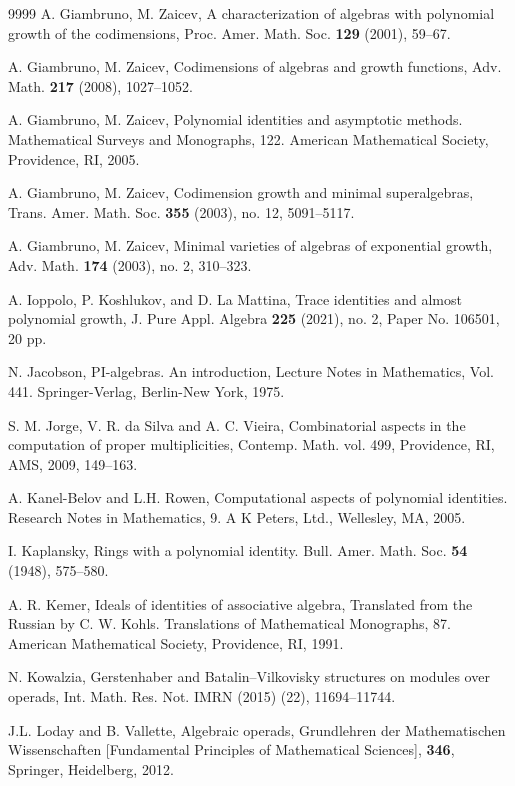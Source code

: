 \documentclass{amsart}
\theoremstyle{definition}
\theoremstyle{remark}
\numberwithin{equation}{section}
\begin{document}
\begin{thebibliography}{9999}
A. Giambruno, M. Zaicev, 
A characterization of algebras with polynomial growth of the codimensions,
Proc. Amer. Math. Soc. \textbf{129} (2001), 59–67.
	
A. Giambruno, M. Zaicev,
Codimensions of algebras and growth functions,
Adv. Math. \textbf{217} (2008), 1027--1052.
	
A. Giambruno, M. Zaicev,
Polynomial identities and asymptotic methods.
Mathematical Surveys and Monographs, 122. American Mathematical Society, Providence, RI, 2005.


A. Giambruno, M. Zaicev,
Codimension growth and minimal superalgebras, 
Trans. Amer. Math. Soc. {\bf 355} (2003), no. 12, 5091--5117. 

A. Giambruno, M. Zaicev,
Minimal varieties of algebras of exponential growth, 
Adv. Math. {\bf 174} (2003), no. 2, 310--323. 

A. Ioppolo, P. Koshlukov, and D. La Mattina, 
Trace identities and almost polynomial growth, 
J. Pure Appl. Algebra {\bf 225} (2021), no. 2, 
Paper No. 106501, 20 pp.



N. Jacobson, PI-algebras. An introduction, Lecture Notes in Mathematics, Vol. 441.
Springer-Verlag, Berlin-New York, 1975.
 

S. M. Jorge, V. R. da Silva and A. C. Vieira, Combinatorial aspects in the computation of proper multiplicities, Contemp. Math. vol. 499, Providence, RI, AMS, 2009,  149--163.

A. Kanel-Belov and L.H. Rowen, 
Computational aspects of polynomial identities. 
Research Notes in Mathematics, 9. A K Peters, Ltd., 
Wellesley, MA, 2005. 

I. Kaplansky, 
Rings with a polynomial identity.
Bull. Amer. Math. Soc. 
{\bf 54} (1948), 575--580.

A. R. Kemer,
Ideals of identities of associative algebra, 
Translated from the Russian by C. W. Kohls. 
Translations of Mathematical Monographs, 87. 
American Mathematical Society, Providence, RI, 1991. 
	
N. Kowalzia,
Gerstenhaber and Batalin–Vilkovisky structures on modules
over operads,
Int. Math. Res. Not. IMRN (2015) (22), 11694–11744.
	
	
J.L. Loday and B. Vallette,
Algebraic operads,
Grundlehren der Mathematischen Wissenschaften [Fundamental Principles of Mathematical Sciences],
{\bf 346}, Springer, Heidelberg, 2012.


\end{thebibliography}
\end{document}

